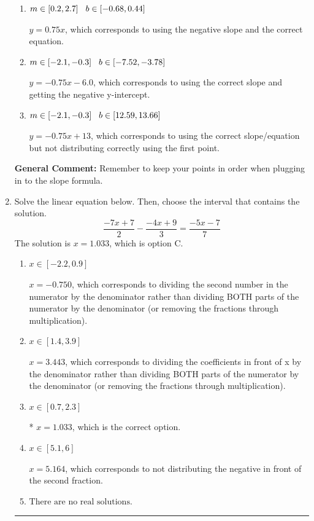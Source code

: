 \documentclass{extbook}[14pt]
\newcommand{\litem}[1]{\item #1

\rule{\textwidth}{0.4pt}}
\begin{document}
\begin{enumerate}
{\begin{enumerate}[label=\Alph*.]
 $y = -0.75x -1$, which corresponds to using the correct slope/equation but not distributing correctly using the second point.
\item \( m \in [0.2, 2.7] \hspace*{3mm} b \in [-0.68, 0.44] \)

 $y = 0.75x$, which corresponds to using the negative slope and the correct equation.
\item \( m \in [-2.1, -0.3] \hspace*{3mm} b \in [-7.52, -3.78] \)

 $y = -0.75x -6.0$, which corresponds to using the correct slope and getting the negative y-intercept.
\item \( m \in [-2.1, -0.3] \hspace*{3mm} b \in [12.59, 13.66] \)

 $y = -0.75x + 13$, which corresponds to using the correct slope/equation but not distributing correctly using the first point.
\end{enumerate}

\textbf{General Comment:} Remember to keep your points in order when plugging in to the slope formula.
}
\litem{
Solve the linear equation below. Then, choose the interval that contains the solution.
\[ \frac{-7x + 7}{2} - \frac{-4x + 9}{3} = \frac{-5x -7}{7} \]The solution is \( x = 1.033 \), which is option C.\begin{enumerate}[label=\Alph*.]
\item \( x \in [-2.2, 0.9] \)

 $x = -0.750$, which corresponds to dividing the second number in the numerator by the denominator rather than dividing BOTH parts of the numerator by the denominator (or removing the fractions through multiplication).
\item \( x \in [1.4, 3.9] \)

 $x = 3.443$, which corresponds to dividing the coefficients in front of x by the denominator rather than dividing BOTH parts of the numerator by the denominator (or removing the fractions through multiplication).
\item \( x \in [0.7, 2.3] \)

* $x = 1.033$, which is the correct option.
\item \( x \in [5.1, 6] \)

 $x = 5.164$, which corresponds to not distributing the negative in front of the second fraction.
\item \( \text{There are no real solutions.} \)


\end{enumerate}}
\end{enumerate}
\end{document}
